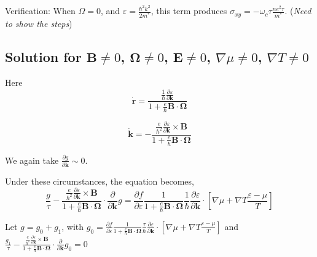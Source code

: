 \documentclass[aps,pra,amsmath,amssymb,floatfix,twocolumn, amsmath, superscriptaddress, twocolumn]{revtex4-2}
\newcommand{\bvec}[1]{{\mathbf #1}}
\begin{document}
Verification: When $\Omega = 0$, and $\varepsilon = \frac{\hbar^2 k^2}{2 m^*}$, this term produces $\sigma_{xy} = -\omega_c \tau \frac{n e^2 \tau}{m^*}$.
(\textit{Need to show the steps})

\subsection{Solution for $\bvec{B}\neq0$, $\bvec{\Omega}\neq 0$, $\bvec{E} \neq 0$, $\nabla \mu \neq 0$, $\nabla T \neq 0$}

Here \begin{equation}
\dot{\bvec{r}} = \frac{\frac{1}{\hbar} \frac{\partial \varepsilon}{\partial \bvec{k}}}{1 + \frac{e}{\hbar} \bvec{B}\cdot\bvec{\Omega}}
\end{equation}

\begin{equation}
\dot{\bvec{k}} = -\frac{\frac{e}{\hbar^2} \frac{\partial \varepsilon}{\partial \bvec{k}} \times \bvec{B}}{1 + \frac{e}{\hbar} \bvec{B}\cdot\bvec{\Omega}}
\end{equation}

We again take $\frac{\partial g}{\partial \bvec{k}} \sim 0$.

Under these circumstances, the equation becomes,
$$
\frac{g}{\tau} -\frac{\frac{e}{\hbar^2} \frac{\partial \varepsilon}{\partial \bvec{k}} \times \bvec{B}}{1 + \frac{e}{\hbar} \bvec{B}\cdot\bvec{\Omega}} \cdot\frac{\partial}{\partial \bvec{k}} g = \frac{\partial f}{\partial \varepsilon}\frac{1}{1 + \frac{e}{\hbar} \bvec{B}\cdot\bvec{\Omega}}
\frac{1}{\hbar} \frac{\partial \varepsilon}{\partial \bvec{k}}\cdot\left[ \nabla{\mu} + \nabla T \frac{\varepsilon - \mu}{T}\right] $$

Let $g = g_0 + g_1$, with $g_0 = \frac{\partial f}{\partial \varepsilon}\frac{1}{1 + \frac{e}{\hbar} \bvec{B}\cdot\bvec{\Omega}}
\frac{\tau}{\hbar} \frac{\partial \varepsilon}{\partial \bvec{k}}\cdot\left[ \nabla{\mu} + \nabla T \frac{\varepsilon - \mu}{T}\right]$ and $\frac{g_1}{\tau} -\frac{\frac{e}{\hbar^2} \frac{\partial \varepsilon}{\partial \bvec{k}} \times \bvec{B}}{1 + \frac{e}{\hbar} \bvec{B}\cdot\bvec{\Omega}} \cdot\frac{\partial}{\partial \bvec{k}} g_0 = 0$
\end{document}
